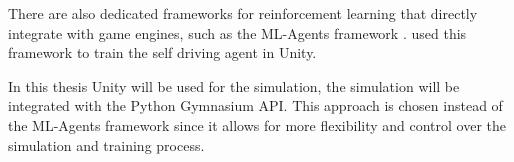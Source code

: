 There are also dedicated frameworks for reinforcement learning that directly integrate with game engines, such as the ML-Agents framework \autocite{mlagents}. \autocite{maximilian} used this framework to train the self driving agent in Unity.

In this thesis Unity will be used for the simulation, the simulation will be integrated with the Python Gymnasium API. This approach is chosen instead of the ML-Agents framework since it allows for more flexibility and control over the simulation and training process.
















